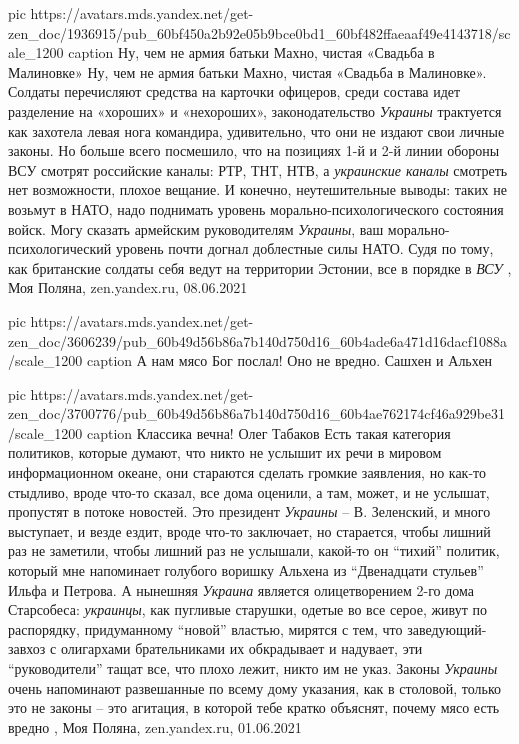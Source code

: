\ifcmt
  pic https://avatars.mds.yandex.net/get-zen_doc/1936915/pub_60bf450a2b92e05b9bce0bd1_60bf482ffaeaaf49e4143718/scale_1200
  caption Ну, чем не армия батьки Махно, чистая «Свадьба в Малиновке»
\fi
Ну, чем не армия батьки Махно, чистая «Свадьба в Малиновке». Солдаты
перечисляют средства на карточки офицеров, среди состава идет разделение на
«хороших» и «нехороших», законодательство \emph{Украины} трактуется как захотела левая
нога командира, удивительно, что они не издают свои личные законы. Но больше
всего посмешило, что на позициях 1-й и 2-й линии обороны ВСУ смотрят российские
каналы: РТР, ТНТ, НТВ, а \emph{украинские каналы} смотреть нет возможности, плохое
вещание.  И конечно, неутешительные выводы: таких не возьмут в НАТО, надо
поднимать уровень морально-психологического состояния войск.  Могу сказать
армейским руководителям \emph{Украины}, ваш морально-психологический уровень почти
догнал доблестные силы НАТО. Судя по тому, как британские солдаты себя ведут на
территории Эстонии, все в порядке в \emph{ВСУ}
, 
Моя Поляна, zen.yandex.ru, 08.06.2021

\ifcmt
  pic https://avatars.mds.yandex.net/get-zen_doc/3606239/pub_60b49d56b86a7b140d750d16_60b4ade6a471d16dacf1088a/scale_1200
  caption А нам мясо Бог послал! Оно не вредно. Сашхен и Альхен

  pic https://avatars.mds.yandex.net/get-zen_doc/3700776/pub_60b49d56b86a7b140d750d16_60b4ae762174cf46a929be31/scale_1200
  caption Классика вечна! Олег Табаков
\fi
Есть такая категория политиков, которые думают, что никто не услышит их речи в
мировом информационном океане, они стараются сделать громкие заявления, но
как-то стыдливо, вроде что-то сказал, все дома оценили, а там, может, и не
услышат, пропустят в потоке новостей.  Это президент \emph{Украины} – В. Зеленский, и
много выступает, и везде ездит, вроде что-то заключает, но старается, чтобы
лишний раз не заметили, чтобы лишний раз не услышали, какой-то он \enquote{тихий}
политик, который мне напоминает голубого воришку Альхена из \enquote{Двенадцати
стульев} Ильфа и Петрова. А нынешняя \emph{Украина} является олицетворением 2-го дома
Старсобеса: \emph{украинцы}, как пугливые старушки, одетые во все серое, живут по
распорядку, придуманному \enquote{новой} властью, мирятся с тем, что заведующий-завхоз
с олигархами брательниками их обкрадывает и надувает, эти \enquote{руководители} тащат
все, что плохо лежит, никто им не указ. Законы \emph{Украины} очень напоминают
развешанные по всему дому указания, как в столовой, только это не законы – это
агитация, в которой тебе кратко объяснят, почему мясо есть вредно
, Моя Поляна, zen.yandex.ru, 01.06.2021

